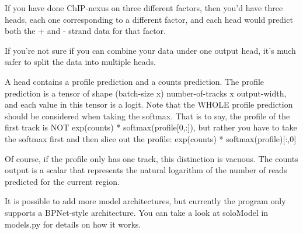 \documentclass{article}
\begin{document}
If you have done ChIP-nexus on three different factors, then you'd have three heads, each one corresponding to a different factor, and each head would predict both the + and - strand data for that factor. 

If you're not sure if you can combine your data under one output head, it's much safer to split the data into multiple heads. 

A head contains a profile prediction and a counts prediction. The profile prediction is a tensor of shape (batch-size x) number-of-tracks x output-width, and each value in this tensor is a logit. 
Note that the WHOLE profile prediction should be considered when taking the softmax. 
That is to say, the profile of the first track is NOT exp(counts) * softmax(profile[0,:]), but rather you have to take the softmax first and then slice out the profile: exp(counts) * softmax(profile)[:,0]

Of course, if the profile only has one track, this distinction is vacuous. 
The counts output is a scalar that represents the natural logarithm of the number of reads predicted for the current region. 

It is possible to add more model architectures, but currently the program only supports a BPNet-style architecture. You can take a look at soloModel in models.py for details on how it works. 
\end{document}
